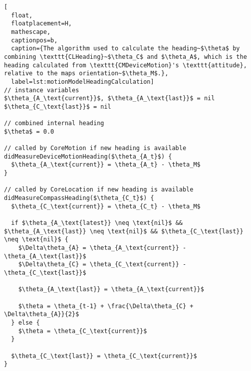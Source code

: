 \begin{lstlisting}[
  float,
  floatplacement=H,
  mathescape,
  captionpos=b,
  caption={The algorithm used to calculate the heading~$\theta$ by combining \texttt{CLHeading}~$\theta_C$ and $\theta_A$, which is the heading calculated from \texttt{CMDeviceMotion}'s \texttt{attitude}, relative to the maps orientation~$\theta_M$.},
  label=lst:motionModelHeadingCalculation]
// instance variables
$\theta_{A_\text{current}}$, $\theta_{A_\text{last}}$ = nil
$\theta_{C_\text{last}}$ = nil

// combined internal heading
$\theta$ = 0.0

// called by CoreMotion if new heading is available
didMeasureDeviceMotionHeading($\theta_{A_t}$) {
  $\theta_{A_\text{current}} = \theta_{A_t} - \theta_M$
}

// called by CoreLocation if new heading is available
didMeasureCompassHeading($\theta_{C_t}$) {
  $\theta_{C_\text{current}} = \theta_{C_t} - \theta_M$

  if $\theta_{A_\text{latest}} \neq \text{nil}$ && $\theta_{A_\text{last}} \neq \text{nil}$ && $\theta_{C_\text{last}} \neq \text{nil}$ {
    $\Delta\theta_{A} = \theta_{A_\text{current}} - \theta_{A_\text{last}}$
    $\Delta\theta_{C} = \theta_{C_\text{current}} - \theta_{C_\text{last}}$

    $\theta_{A_\text{last}} = \theta_{A_\text{current}}$

    $\theta = \theta_{t-1} + \frac{\Delta\theta_{C} + \Delta\theta_{A}}{2}$
  } else {
    $\theta = \theta_{C_\text{current}}$
  }

  $\theta_{C_\text{last}} = \theta_{C_\text{current}}$
}
\end{lstlisting}
